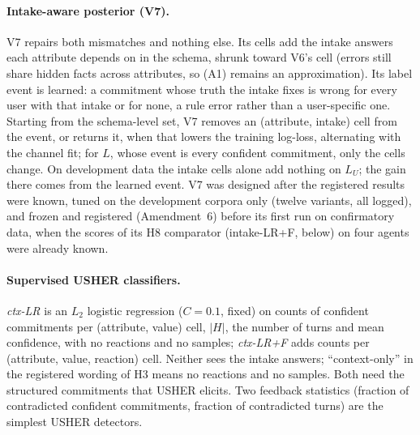 \documentclass[10pt,a4paper,twocolumn]{article}
\newcommand{\LU}{L_{U}}
\begin{document}
\paragraph{Intake-aware posterior (V7).} V7 repairs both mismatches and
nothing else. Its cells add the intake answers each attribute depends on in
the schema, shrunk toward V6's cell (errors still share hidden facts across attributes, so (A1) remains an approximation).
Its label event is learned: a commitment whose truth the intake fixes is
wrong for every user with that intake or for none, a rule error rather than a
user-specific one. Starting from the schema-level set, V7 removes an
(attribute, intake) cell from the event, or returns it, when that lowers the
training log-loss, alternating with the channel fit; for $L$, whose event is
every confident commitment, only the cells change. On development data the intake cells alone add nothing on
$\LU$; the gain there comes from the learned event. V7 was designed after the registered
results were known, tuned on the development corpora only (twelve variants,
all logged), and frozen and registered (Amendment~6) before its first run on
confirmatory data, when the scores of its H8 comparator (intake-LR+F, below)
on four agents were already known.

\paragraph{Supervised USHER classifiers.} \emph{ctx-LR} is an $L_2$ logistic
regression ($C=0.1$, fixed) on counts of confident commitments per
(attribute, value) cell, $|H|$, the number of turns and mean confidence, with
no reactions and no samples; \emph{ctx-LR+F} adds counts per (attribute,
value, reaction) cell. Neither sees the intake answers; ``context-only'' in
the registered wording of H3 means no reactions and no samples. Both need
the structured commitments that USHER elicits. Two feedback statistics
(fraction of contradicted confident commitments, fraction of contradicted
turns) are the simplest USHER detectors.
\end{document}
